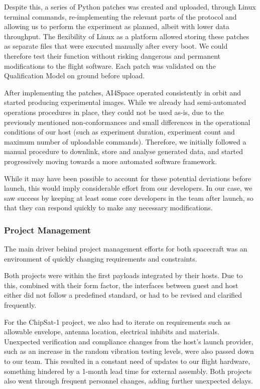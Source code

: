 \documentclass[journal,10pt]{IEEEtran}
\begin{document}
Despite this, a series of Python patches was created and uploaded, through Linux terminal commands, re-implementing the relevant parts of the protocol and allowing us to perform the experiment as planned, albeit with lower data throughput. The flexibility of Linux as a platform allowed storing these patches as separate files that were executed manually after every boot. We could therefore test their function without risking dangerous and permanent modifications to the flight software. Each patch was validated on the Qualification Model on ground before upload.

After implementing the patches, AI4Space operated consistently in orbit and started producing experimental images.
While we already had semi-automated operations procedures in place,
they could not be used as-is, due to the previously mentioned non-conformances and small differences in the operational conditions of our host (such as experiment duration, experiment count and maximum number of uploadable commands).
Therefore, we initially followed a manual procedure to downlink, store and analyse generated data, and started progressively moving towards a more automated software framework.

While it may have been possible to account for these potential deviations before launch, this would imply considerable effort from our developers.
In our case, we saw success by keeping at least some core developers in the team after launch, so that they can respond quickly to make any necessary modifications.



\subsubsection{Project Management}

The main driver behind project management efforts for both spacecraft was an environment of quickly changing requirements and constraints.

Both projects were within the first payloads integrated by their hosts. Due to this, combined with their form factor, the interfaces between guest and host either did not follow a predefined standard, or had to be revised and clarified frequently. 

For the ChipSat-1 project,
we also had to iterate on requirements such as allowable envelope, antenna location, electrical inhibits and materials.
Unexpected verification and compliance changes from the host's launch provider, such as an increase in the random vibration testing levels, were also passed down to our team. This resulted in a constant need of updates to our flight hardware, something hindered by a 1-month lead time for external assembly. Both projects also went through frequent personnel changes, adding further unexpected delays.
\end{document}
